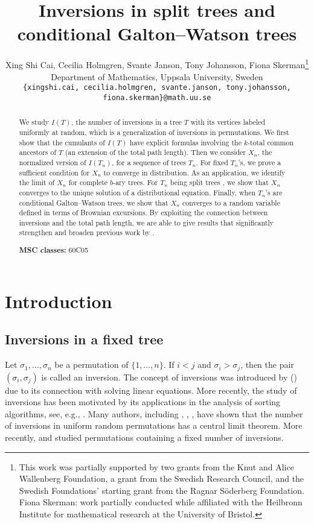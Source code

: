 \documentclass[11pt]{article}
\title{Inversions in split trees and conditional Galton--Watson trees}
\author{Xing Shi Cai, Cecilia Holmgren, Svante Janson, Tony Johansson, Fiona Skerman\thanks{This work was
        partially supported by two grants from the Knut and Alice Wallenberg Foundation, a grant
        from the Swedish Research Council, and the Swedish Foundations' starting grant from the
        Ragnar S\"{o}derberg Foundation. Fiona Skerman: work partially conducted while affiliated with the Heilbronn Institute for mathematical research at the University of Bristol. }\\
    Department of Mathematics, Uppsala University, Sweden\\
    \texttt{\small\{xingshi.cai, cecilia.holmgren, svante.janson, tony.johansson, fiona.skerman\}{@}math.uu.se}
}
\numberwithin{theorem}{section}
\theoremstyle{definition}
\numberwithin{equation}{section}
\begin{document}
\maketitle

\begin{abstract}
    We study \(I(T)\), the number of inversions in a tree \(T\) with its vertices labeled uniformly
    at random, which is a generalization of inversions in permutations.
    We first show that the cumulants of \(I(T)\) have explicit formulas involving 
    the \(k\)-total common ancestors of \(T\) (an extension of the total path length).
    Then we consider \(X_n\), the normalized version of \(I(T_n)\), for a sequence of trees \(T_n\).
    For fixed \(T_{n}\)'s, we prove a sufficient condition for \(X_n\) to converge in distribution.
    As an application, we identify the limit of \(X_n\) for complete \(b\)-ary trees.
    For \(T_n\) being split trees \cite{MR1634354}, we show that \(X_n\)
    converges to the unique solution of a distributional equation.
    Finally, when \(T_n\)'s are conditional Galton--Watson trees, we show that \(X_n\) converges to
    a random variable defined in terms of Brownian excursions. 
    By exploiting the connection between inversions and the total path length, we are able to
    give results that significantly strengthen and broaden previous work by
    \citet{ps12}.

    \medskip\noindent\textbf{MSC classes:} 60C05
\end{abstract}

\section{Introduction}

\subsection{Inversions in a fixed tree}

Let \(\sigma_1, \dots, \sigma_n\) be a permutation of \(\{1,\dots,n\}\).  If \(i < j\) and
\(\sigma_i > \sigma_j\), then the pair \( (\sigma_i, \sigma_j)\) is called an inversion.  The
concept of inversions was introduced by \citet{cramer1750} (\citeyear{cramer1750}) due to its
connection with solving linear equations.  More recently, the study of inversions has been motivated
by its applications in the analysis of sorting algorithms, see, e.g.,
\cite[Section\ 5.1]{k98}. Many authors, including \citet[pp.\ 256]{f68}, \citet[pp.\ 29]{s97},
\citet{b73}, have shown that the number of inversions in uniform random permutations has a central
limit theorem.  More recently, \citet{m01} and \citet{lp03} studied permutations containing a fixed
number of inversions.
\end{document}
